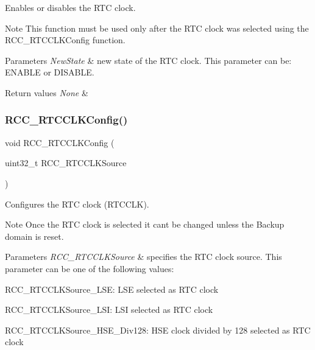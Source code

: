 Enables or disables the R\+TC clock. 

\begin{DoxyNote}{Note}
This function must be used only after the R\+TC clock was selected using the R\+C\+C\+\_\+\+R\+T\+C\+C\+L\+K\+Config function. 
\end{DoxyNote}

\begin{DoxyParams}{Parameters}
{\em New\+State} & new state of the R\+TC clock. This parameter can be\+: E\+N\+A\+B\+LE or D\+I\+S\+A\+B\+LE. \\
\hline
\end{DoxyParams}

\begin{DoxyRetVals}{Return values}
{\em None} & \\
\hline
\end{DoxyRetVals}
\mbox{\label{group___r_c_c___exported___functions_ga1473d8a5a020642966359611c44181b0}} 
\subsubsection{\texorpdfstring{RCC\_RTCCLKConfig()}{RCC\_RTCCLKConfig()}}
{\footnotesize\ttfamily void R\+C\+C\+\_\+\+R\+T\+C\+C\+L\+K\+Config (\begin{DoxyParamCaption}\item[{uint32\+\_\+t}]{R\+C\+C\+\_\+\+R\+T\+C\+C\+L\+K\+Source }\end{DoxyParamCaption})}



Configures the R\+TC clock (R\+T\+C\+C\+LK). 

\begin{DoxyNote}{Note}
Once the R\+TC clock is selected it can\textquotesingle{}t be changed unless the Backup domain is reset. 
\end{DoxyNote}

\begin{DoxyParams}{Parameters}
{\em R\+C\+C\+\_\+\+R\+T\+C\+C\+L\+K\+Source} & specifies the R\+TC clock source. This parameter can be one of the following values\+: \begin{DoxyItemize}
\item R\+C\+C\+\_\+\+R\+T\+C\+C\+L\+K\+Source\+\_\+\+L\+SE\+: L\+SE selected as R\+TC clock \item R\+C\+C\+\_\+\+R\+T\+C\+C\+L\+K\+Source\+\_\+\+L\+SI\+: L\+SI selected as R\+TC clock \item R\+C\+C\+\_\+\+R\+T\+C\+C\+L\+K\+Source\+\_\+\+H\+S\+E\+\_\+\+Div128\+: H\+SE clock divided by 128 selected as R\+TC clock \end{DoxyItemize}
\\
\hline
\end{DoxyParams}

